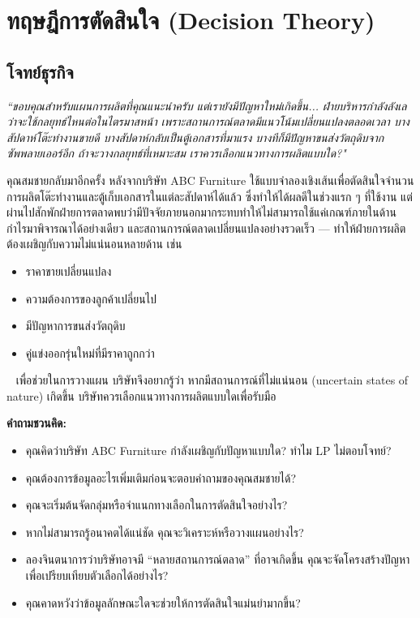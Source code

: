 \chapter{ทฤษฎีการตัดสินใจ (Decision Theory)}

\section*{โจทย์ธุรกิจ}
\begin{tcolorbox}[colback=white!100!white, colframe=black!80!white,
  title=ข้อความ,
  fonttitle=\bfseries,
  sharp corners=southwest,
  boxrule=0.8pt,
  left=1mm, right=1mm, top=1mm, bottom=1mm,
]
\emph{
``ขอบคุณสำหรับแผนการผลิตที่คุณแนะนำครับ แต่เรายังมีปัญหาใหม่เกิดขึ้น...  
ฝ่ายบริหารกำลังลังเลว่าจะใช้กลยุทธ์ไหนต่อในไตรมาสหน้า  
เพราะสถานการณ์ตลาดมีแนวโน้มเปลี่ยนแปลงตลอดเวลา  
บางสัปดาห์โต๊ะทำงานขายดี บางสัปดาห์กลับเป็นตู้เอกสารที่มาแรง  
บางทีก็มีปัญหาขนส่งวัตถุดิบจากซัพพลายเออร์อีก  
ถ้าจะวางกลยุทธ์ที่เหมาะสม เราควรเลือกแนวทางการผลิตแบบใด?"}
\end{tcolorbox}
คุณสมชายกลับมาอีกครั้ง หลังจากบริษัท ABC Furniture ใช้แบบจำลองเชิงเส้นเพื่อตัดสินใจจำนวนการผลิตโต๊ะทำงานและตู้เก็บเอกสารในแต่ละสัปดาห์ได้แล้ว ซึ่งทำให้ได้ผลดีในช่วงแรก ๆ ที่ใช้งาน แต่ผ่านไปสักพักฝ่ายการตลาดพบว่ามีปัจจัยภายนอกมากระทบทำให้ไม่สามารถใช้แค่เกณฑ์ภายในด้านกำไรมาพิจารณาได้อย่างเดียว และสถานการณ์ตลาดเปลี่ยนแปลงอย่างรวดเร็ว — ทำให้ฝ่ายการผลิตต้องเผชิญกับความไม่แน่นอนหลายด้าน เช่น
\begin{itemize}
    \item ราคาขายเปลี่ยนแปลง
    \item ความต้องการของลูกค้าเปลี่ยนไป
    \item มีปัญหาการขนส่งวัตถุดิบ
    \item คู่แข่งออกรุ่นใหม่ที่มีราคาถูกกว่า
\end{itemize}~
เพื่อช่วยในการวางแผน บริษัทจึงอยากรู้ว่า หากมีสถานการณ์ที่ไม่แน่นอน (uncertain states of nature) เกิดขึ้น บริษัทควรเลือกแนวทางการผลิตแบบใดเพื่อรับมือ

\textbf{คำถามชวนคิด:}
\begin{itemize}
    \item คุณคิดว่าบริษัท ABC Furniture กำลังเผชิญกับปัญหาแบบใด? ทำไม LP ไม่ตอบโจทย์?
    \item คุณต้องการข้อมูลอะไรเพิ่มเติมก่อนจะตอบคำถามของคุณสมชายได้?
    \item คุณจะเริ่มต้นจัดกลุ่มหรือจำแนกทางเลือกในการตัดสินใจอย่างไร?
    \item หากไม่สามารถรู้อนาคตได้แน่ชัด คุณจะวิเคราะห์หรือวางแผนอย่างไร?
    \item ลองจินตนาการว่าบริษัทอาจมี “หลายสถานการณ์ตลาด” ที่อาจเกิดขึ้น คุณจะจัดโครงสร้างปัญหาเพื่อเปรียบเทียบตัวเลือกได้อย่างไร?
    \item คุณคาดหวังว่าข้อมูลลักษณะใดจะช่วยให้การตัดสินใจแม่นยำมากขึ้น?
\end{itemize}

